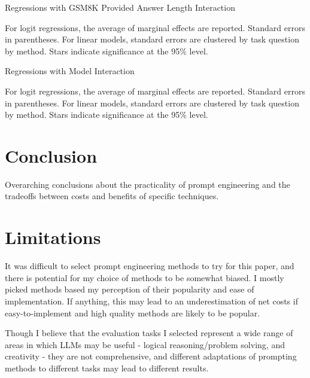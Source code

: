 \documentclass[11pt]{article}
\begin{document}
\begin{table}
  \caption{Regressions with GSM8K Provided Answer Length Interaction}
  \centering
  \tiny
    
  \label{tab:regressions_provided_interaction}
  \newline \newline \footnotesize For logit regressions, the average of marginal effects are reported. Standard errors in parentheses. For linear models, standard errors are clustered by task question by method. Stars indicate significance at the 95\% level.
\end{table}

\begin{table}
  \caption{Regressions with Model Interaction}
  \centering
  \tiny
    
  \label{tab:regressions_model_interaction}
  \newline \newline \footnotesize For logit regressions, the average of marginal effects are reported. Standard errors in parentheses. For linear models, standard errors are clustered by task question by method. Stars indicate significance at the 95\% level.
\end{table}

\twocolumn

\section*{Conclusion}

Overarching conclusions about the practicality of prompt engineering and the tradeoffs between costs and benefits of specific techniques.

\section*{Limitations}

It was difficult to select prompt engineering methods to try for this paper, and there is potential for my choice of methods to be somewhat biased. I mostly picked methods based my perception of their popularity and ease of implementation. If anything, this may lead to an underestimation of net costs if easy-to-implement and high quality methods are likely to be popular. 

Though I believe that the evaluation tasks I selected represent a wide range of areas in which LLMs may be useful - logical reasoning/problem solving, and creativity - they are not comprehensive, and different adaptations of prompting methods to different tasks may lead to different results.
\end{document}
